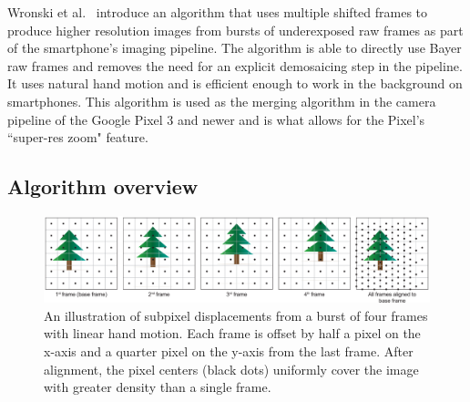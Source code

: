 \documentclass{sig-alternate}
\begin{document}


Wronski et al.~\cite{Wronski2019} introduce an algorithm that uses multiple shifted frames to produce higher resolution images from bursts of underexposed raw frames as part of the smartphone's imaging pipeline. The algorithm is able to directly use Bayer raw frames and removes the need for an explicit demosaicing step in the pipeline. It uses natural hand motion and is efficient enough to work in the background on smartphones. This algorithm is used as the merging algorithm in the camera pipeline of the Google Pixel 3 and newer and is what allows for the Pixel's ``super-res zoom" feature.

\subsection{Algorithm overview}

\begin{figure}
\centering
\includegraphics[width=\textwidth]{Wronski2019-figure-4}
\caption{An illustration of subpixel displacements from a burst of four frames with linear hand motion. Each frame is offset by half a pixel on the x-axis and a quarter pixel on the y-axis from the last frame. After alignment, the pixel centers (black dots) uniformly cover the image with greater density than a single frame.~\cite{Wronski2019}}
\label{fig:Wronski2019Fig4}



\end{figure}

\end{document}
